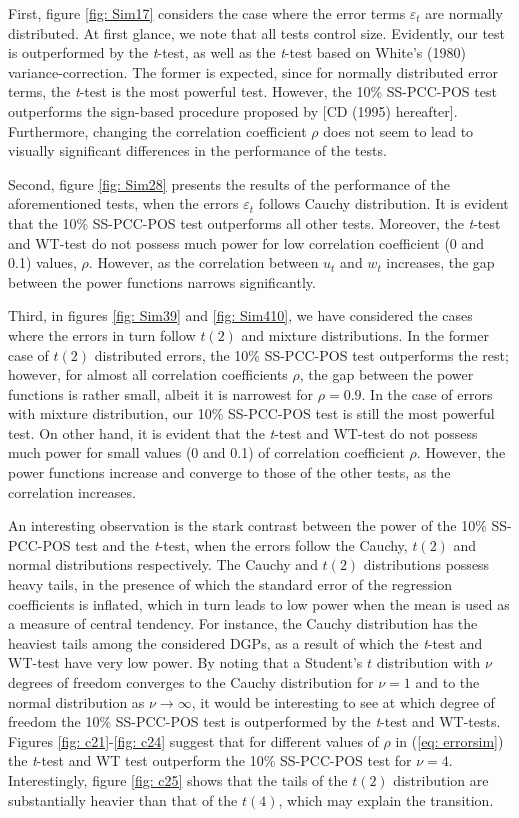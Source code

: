 \documentclass[harvard,11pt]{article}
\begin{document}
First, figure \ref{fig: Sim17} considers the case where the error terms $\varepsilon_t$ are normally distributed. At first glance, we note that all tests control size. Evidently, our test is outperformed by the \textit{t}-test, as well as the \textit{t}-test based on White's (1980) variance-correction. The former is expected, since for normally distributed error terms, the \textit{t}-test is the most powerful test. However, the 10\% SS-PCC-POS test outperforms the sign-based procedure proposed by \citet{dufour1995exact} [CD (1995) hereafter]. Furthermore, changing the correlation coefficient $\rho$ does not seem to lead to visually significant differences in the performance of the tests.
 
Second, figure \ref{fig: Sim28} presents the results of the performance of the aforementioned tests, when the errors $\varepsilon_t$ follows Cauchy distribution. It is evident that the 10\% SS-PCC-POS test outperforms all other tests. Moreover, the \textit{t}-test and WT-test do not possess much power for low correlation coefficient (0 and 0.1) values, $\rho$. However, as the correlation between $u_t$ and $w_t$ increases, the gap between the power functions narrows significantly.  

Third, in figures \ref{fig: Sim39} and \ref{fig: Sim410}, we have considered the cases where the errors in turn follow $t(2)$ and mixture distributions. In the former case of $t(2)$ distributed errors, the 10\% SS-PCC-POS test outperforms the rest; however, for almost all correlation coefficients $\rho$, the gap between the power functions is rather small, albeit it is narrowest for $\rho=0.9$. In the case of errors with mixture distribution, our 10\% SS-PCC-POS test is still the most powerful test. On other hand, it is evident that the \textit{t}-test and WT-test do not possess much power for small values (0 and 0.1) of correlation coefficient $\rho$. However, the power functions increase and converge to those of the other tests, as the correlation increases.

An interesting observation is the stark contrast between the power of the 10\% SS-PCC-POS test and the \textit{t}-test, when the errors follow the Cauchy, $t(2)$ and normal distributions respectively. The Cauchy and $t(2)$ distributions possess heavy tails, in the presence of which the standard error of the regression coefficients is inflated, which in turn leads to low power when the mean is used as a measure of central tendency. For instance, the Cauchy distribution has the heaviest tails among the considered  DGPs, as a result of which the \textit{t}-test and WT-test have very low power. By noting that a Student's $t$ distribution with $\nu$ degrees of freedom converges to the Cauchy distribution for $\nu=1$ and to the normal distribution as $\nu\rightarrow \infty$, it would be interesting to see at which degree of freedom the 10\% SS-PCC-POS test is outperformed by the \textit{t}-test and WT-tests.  Figures \ref{fig: c21}-\ref{fig: c24} suggest that for different values of $\rho$ in (\ref{eq: errorsim}) the \textit{t}-test and WT test outperform the 10\% SS-PCC-POS test for $\nu=4$. Interestingly, figure \ref{fig: c25} shows that the tails of the $t(2)$ distribution are substantially heavier than that of the $t(4)$, which may explain the transition.
\end{document}
